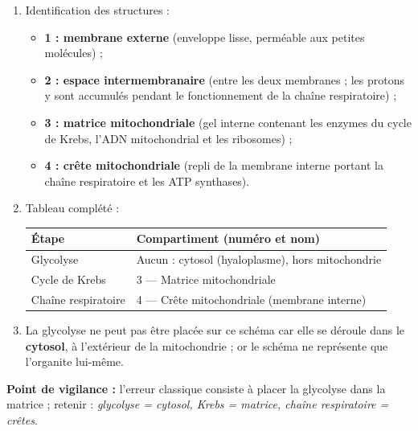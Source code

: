 \documentclass[11pt]{article}
\begin{document}
\begin{corrige}
\begin{enumerate}
\item Identification des structures :
\begin{itemize}
\item \textbf{1 : membrane externe} (enveloppe lisse, perméable aux petites molécules) ;
\item \textbf{2 : espace intermembranaire} (entre les deux membranes ; les protons y sont accumulés pendant le fonctionnement de la chaîne respiratoire) ;
\item \textbf{3 : matrice mitochondriale} (gel interne contenant les enzymes du cycle de Krebs, l'ADN mitochondrial et les ribosomes) ;
\item \textbf{4 : crête mitochondriale} (repli de la membrane interne portant la chaîne respiratoire et les ATP synthases).
\end{itemize}
\item Tableau complété :
\begin{center}
\begin{tabularx}{\linewidth}{|X|X|}
\hline
\rowcolor{popblueL} Étape & Compartiment (numéro et nom) \\
\hline
Glycolyse & Aucun : cytosol (hyaloplasme), hors mitochondrie \\
\hline
Cycle de Krebs & 3 — Matrice mitochondriale \\
\hline
Chaîne respiratoire & 4 — Crête mitochondriale (membrane interne) \\
\hline
\end{tabularx}
\end{center}
\item La glycolyse ne peut pas être placée sur ce schéma car elle se déroule dans le \textbf{cytosol}, à l'extérieur de la mitochondrie ; or le schéma ne représente que l'organite lui-même.
\end{enumerate}
\textbf{Point de vigilance :} l'erreur classique consiste à placer la glycolyse dans la matrice ; retenir : \emph{glycolyse = cytosol, Krebs = matrice, chaîne respiratoire = crêtes}.
\end{corrige}
\end{document}
